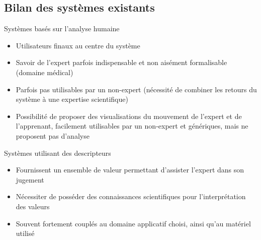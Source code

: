     \subsection{Bilan des systèmes existants}
    \begin{frame}{\subsecname}
        \begin{block}{Systèmes basés sur l'analyse humaine}
            \begin{itemize}[label=$\bullet$]
                \item Utilisateurs finaux au centre du système
                \item Savoir de l'expert parfois indispensable et non aisément formalisable (domaine médical)
                \item Parfois pas utilisables par un non-expert (nécessité de combiner les retours du système à une expertise scientifique)
                \item Possibilité de proposer des visualisations du mouvement de l'expert et de l'apprenant, facilement utilisables par un non-expert et génériques, mais ne proposent pas d'analyse
            \end{itemize}
        \end{block}
        
        \begin{block}{Systèmes utilisant des descripteurs}
            \begin{itemize}[label=$\bullet$]
                \item Fournissent un ensemble de valeur permettant d'assister l'expert dans son jugement
                \item Nécessiter de posséder des connaissances scientifiques pour l'interprétation des valeurs
                \item Souvent fortement couplés au domaine applicatif choisi, ainsi qu'au matériel utilisé
            \end{itemize}
        \end{block}
    \end{frame}
    
